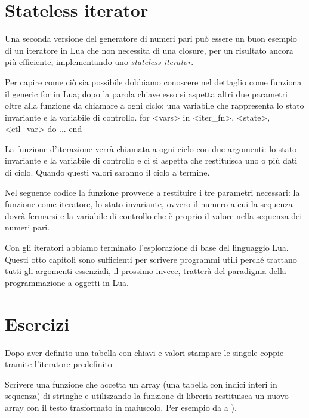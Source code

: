 \section{Stateless iterator}
\label{secFondStatelessIter}

Una seconda versione del generatore di numeri pari può essere un buon esempio
di un iteratore in Lua che non necessita di una closure, per un risultato ancora
più efficiente, implementando uno \emph{stateless iterator}.

Per capire come ciò sia possibile dobbiamo conoscere nel dettaglio come
funziona il generic for in Lua; dopo la parola chiave  esso si aspetta
altri due parametri oltre alla funzione da chiamare a ogni ciclo: una variabile
che rappresenta lo stato invariante e la variabile di controllo.
\lines
for <vars> in <iter_fn>, <state>, <ctl_var> do
    ...
end
\endlines
{}

La funzione d'iterazione verrà chiamata a ogni ciclo con due argomenti: lo stato
invariante e la variabile di controllo e ci si aspetta che restituisca uno o più
dati di ciclo. Quando questi valori saranno  il ciclo a termine.

Nel seguente codice la funzione  provvede a restituire i tre
parametri necessari: la funzione  come iteratore, lo stato
invariante, ovvero il numero a cui la sequenza dovrà fermarsi e la variabile di
controllo che è proprio il valore nella sequenza dei numeri pari.

Con gli iteratori abbiamo terminato l'esplorazione di base del linguaggio Lua.
Questi otto capitoli sono sufficienti per scrivere programmi utili perché
trattano tutti gli argomenti essenziali, il prossimo invece, tratterà del
paradigma della programmazione a oggetti in Lua.


\section{Esercizi}

\begin{Exercise}[label=iter-01]
Dopo aver definito una tabella con chiavi e valori stampare le singole coppie
tramite l'iteratore predefinito .
\end{Exercise}

\begin{Exercise}[label=iter-02]
Scrivere una funzione che accetta un array (una tabella con indici interi in
sequenza) di stringhe e utilizzando la funzione di libreria 
restituisca un nuovo array con il testo trasformato in maiuscolo. Per esempio da
 a ).
\end{Exercise}

